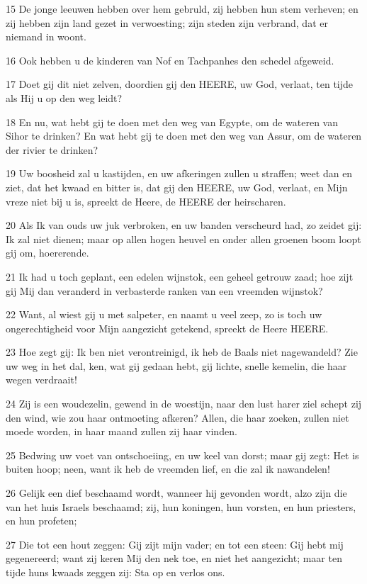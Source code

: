 \par 15 De jonge leeuwen hebben over hem gebruld, zij hebben hun stem verheven; en zij hebben zijn land gezet in verwoesting; zijn steden zijn verbrand, dat er niemand in woont.
\par 16 Ook hebben u de kinderen van Nof en Tachpanhes den schedel afgeweid.
\par 17 Doet gij dit niet zelven, doordien gij den HEERE, uw God, verlaat, ten tijde als Hij u op den weg leidt?
\par 18 En nu, wat hebt gij te doen met den weg van Egypte, om de wateren van Sihor te drinken? En wat hebt gij te doen met den weg van Assur, om de wateren der rivier te drinken?
\par 19 Uw boosheid zal u kastijden, en uw afkeringen zullen u straffen; weet dan en ziet, dat het kwaad en bitter is, dat gij den HEERE, uw God, verlaat, en Mijn vreze niet bij u is, spreekt de Heere, de HEERE der heirscharen.
\par 20 Als Ik van ouds uw juk verbroken, en uw banden verscheurd had, zo zeidet gij: Ik zal niet dienen; maar op allen hogen heuvel en onder allen groenen boom loopt gij om, hoererende.
\par 21 Ik had u toch geplant, een edelen wijnstok, een geheel getrouw zaad; hoe zijt gij Mij dan veranderd in verbasterde ranken van een vreemden wijnstok?
\par 22 Want, al wiest gij u met salpeter, en naamt u veel zeep, zo is toch uw ongerechtigheid voor Mijn aangezicht getekend, spreekt de Heere HEERE.
\par 23 Hoe zegt gij: Ik ben niet verontreinigd, ik heb de Baals niet nagewandeld? Zie uw weg in het dal, ken, wat gij gedaan hebt, gij lichte, snelle kemelin, die haar wegen verdraait!
\par 24 Zij is een woudezelin, gewend in de woestijn, naar den lust harer ziel schept zij den wind, wie zou haar ontmoeting afkeren? Allen, die haar zoeken, zullen niet moede worden, in haar maand zullen zij haar vinden.
\par 25 Bedwing uw voet van ontschoeiing, en uw keel van dorst; maar gij zegt: Het is buiten hoop; neen, want ik heb de vreemden lief, en die zal ik nawandelen!
\par 26 Gelijk een dief beschaamd wordt, wanneer hij gevonden wordt, alzo zijn die van het huis Israels beschaamd; zij, hun koningen, hun vorsten, en hun priesters, en hun profeten;
\par 27 Die tot een hout zeggen: Gij zijt mijn vader; en tot een steen: Gij hebt mij gegenereerd; want zij keren Mij den nek toe, en niet het aangezicht; maar ten tijde huns kwaads zeggen zij: Sta op en verlos ons.
